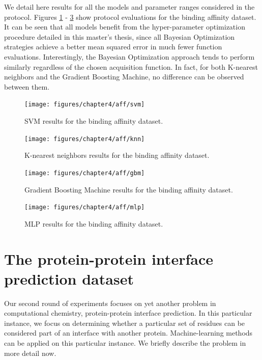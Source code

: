 \documentclass[10pt,a4paper,twoside]{book}
\begin{document}
We detail here results for all the models and parameter ranges considered in the protocol. Figures \ref{fig:affsvm} - \ref{fig:affgbm} show protocol evaluations for the binding affinity dataset. It can be seen that all models benefit from the hyper-parameter optimization procedure detailed in this master's thesis, since all Bayesian Optimization strategies achieve a better mean squared error in much fewer function evaluations. Interestingly, the Bayesian Optimization approach tends to perform similarly regardless of the chosen acquisition function. In fact, for both K-nearest neighbors and the Gradient Boosting Machine, no difference can be observed between them.

\begin{figure}
\centering
\caption{SVM results for the binding affinity dataset.}
\texttt{[image: figures/chapter4/aff/svm]}
\label{fig:affsvm}
\end{figure}

\begin{figure}
\centering
\caption{K-nearest neighbors results for the binding affinity dataset.}
\texttt{[image: figures/chapter4/aff/knn]}
\label{fig:affknn}
\end{figure}

\begin{figure}
\centering
\caption{Gradient Boosting Machine results for the binding affinity dataset.}
\texttt{[image: figures/chapter4/aff/gbm]}
\label{fig:affgbm}
\end{figure}

\begin{figure}
\centering
\caption{MLP results for the binding affinity dataset.}
\texttt{[image: figures/chapter4/aff/mlp]}
\label{fig:affmlp}
\end{figure}

\newpage

\section{The protein-protein interface prediction dataset}

Our second round of experiments focuses on yet another problem in computational chemistry, protein-protein interface prediction. In this particular instance, we focus on determining whether a particular set of residues can be considered part of an interface with another protein. Machine-learning methods can be applied on this particular instance. We briefly describe the problem in more detail now.
\end{document}
